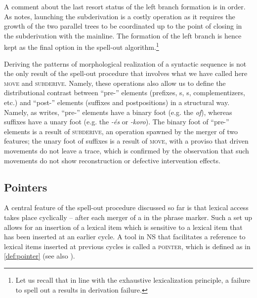 \noindent
A comment about the last resort status of the left branch formation is in order. As \cite{Starke2018} notes, launching the subderivation is a costly operation as it requires the growth of the two parallel trees to be coordinated up to the point of closing in the subderivation with the mainline. The formation of the left branch is hence kept as the final option in the spell-out algorithm.\footnote{Let us recall that in line with the exhaustive lexicalization principle, a failure to spell out a  results in derivation failure. 
}%
\par Deriving the patterns of morphological realization of a syntactic sequence is not the only result of the spell-out procedure that involves what we have called here \textsc{move} and \textsc{subderive}. Namely, these operations also allow us to define the distributional contrast between \mbox{``pre-''} elements (prefixes, s, s, complementizers, etc.) and \mbox{``post-''} elements (suffixes and postpositions) in a structural way. Namely, as \cite{Starke2018} writes, ``pre-'' elements have a binary foot (e.g. the  \textit{of}), whereas suffixes have a unary foot (e.g. the  \textit{-\'es} or \textit{-koro}). The binary foot of ``pre-'' elements is a result of \textsc{subderive}, an operation spawned by the merger of two features; the unary foot of suffixes is a result of \textsc{move}, with a proviso that  driven movements do not leave a trace, which is confirmed by the observation that such movements do not show reconstruction or defective intervention effects. 


\subsection{Pointers}\label{sec:pointers}

A central feature of the spell-out procedure discussed so far is that lexical access takes place cyclically -- after each merger of a  in the phrase marker. Such a set up allows for an insertion of a lexical item which is sensitive to a lexical item that has been inserted at an earlier cycle. A tool in NS  that facilitates a reference to lexical items inserted at previous cycles is called a \textsc{pointer}, which is defined as in \ref{def:pointer} (see also \citealt{TaraldsenNELS,CahaPantcheva2012,Starke2014,GVW2018,CCW-root}). 

